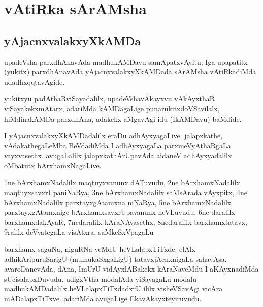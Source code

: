 \chapter{vAtiRka sArAMsha}
\section*{yAjacnxvalakxyXkAMDa}
\centerline{}

\begin{artha}
upadeVsha parxdhAnavAda madhukAMDavu samApatxvAyitu, Iga upapatitx (yukitx) parxdhAnavAda 
yAjacnxvalakxyXkAMDada sArAMsha vAtiRkadiMda udadhxqqtavAgide.

yukitxyu padAthaRviSayadalilx, upadeVshavAkayxvu vAkAyxthaR viSayakekxmAtarx, adariMda 
kAMDagaLige punarukitxdoVSavilalx, hiMdinakAMDa parxdhAna, adakekx aMgavAgi idu 
(IkAMDavu) baMdide.  
\end{artha}

\centerline{}

I yAjacnxvalakxyXkAMDadalilx eraDu adhAyxyagaLive. jalapxkathe, vAdakathegaLeMba BeVdadiMda 
I adhAyxyagaLa parxmeVyAthaRgaLa vayxvasethx. avugaLalilx jalapxkathArUpavAda aidaneV 
adhAyxyadalilx oMbatutx bArxhamxNagaLive.

\centerline{}

\begin{artha}
1ne bArxhamxNadalilx maqtuyxvanunx dATuvudu, 2ne bArxhamxNadalilx maqtuyxsavxrUpaniNaRya, 3ne bArxhamxNadalilx saMsArada vAyxpitx, 4ne bArxhamxNadalilx parxtayxgAtamxna niNaRya, 5ne bArxhamxNadalilx parxtayxgAtamxnige bArxhamxsavxrUpavanunx heVLuvudu. 6ne daralilx barxhamxdakAyaR, 7nedaralilx kAraNAvasethx, 8nedaralilx barxhamxtatavx, 9ralilx deVvategaLa visAtxra, saMkeSxVpagaLu 

barxhamx saguNa, niguRNa veMdU heVLalapxTiTxde. elAlx adhikAripuruSarigU (mumukaSxgaLigU) tatavxjAcnxnigaLa sahavAsa, avaroDanevAda, dAna, ImUrU vidAyxlABakekx kAraNaveMdu I aKAyxnadiMda sUcisalapxDuvudu. udigxVtha modalAda viSayagaLu modalu madhukAMDadalilx heVLalapxTiTxdadxrU ililx visheVSavAgi vicAra mADalapxTiTxve. adariMda avugaLige EkavAkayxteyiruvudu.
\end{artha}

